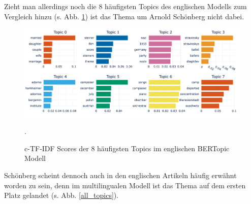 \documentclass[ngerman]{ttlab-qualify}
\begin{document}
\noindent Zieht man allerdings noch die 8 häufigsten Topics des englischen Modells zum Vergleich hinzu (s. Abb. \ref{most_frequent_topics_en}) ist das Thema um Arnold Schönberg nicht dabei.
\begin{figure}[H]
\begin{center}
\includegraphics[width=17cm]{grafiken/Topic_word_scores_en.png}
\caption[c-TF-IDF Scores der 8 häufigsten Topics im englischen BERTopic Modell]{c-TF-IDF Scores der 8 häufigsten Topics im englischen BERTopic Modell}.
\label{most_frequent_topics_en}
\end{center}
\end{figure} 
\noindent Schönberg scheint dennoch auch in den englischen Artikeln häufig erwähnt worden zu sein, denn im multilingualen Modell ist das Thema auf dem ersten Platz gelandet (s. Abb. \ref{all_topics}).
\end{document}
